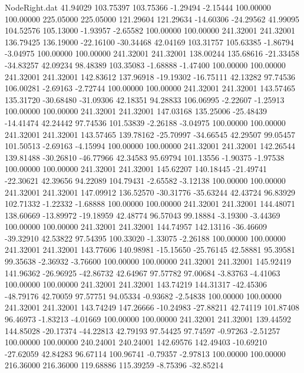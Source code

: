 \begin{filecontents}{NodeRight.dat}
  41.94029  103.75397  103.75366    -1.29494   -2.15444  100.00000  100.00000  225.05000  225.05000  121.29604  121.29634  -14.60306  -24.29562
  41.99095  104.52576  105.13000    -1.93957   -2.65582  100.00000  100.00000  241.32001  241.32001  136.79425  136.19000  -22.16100  -30.34468
  42.04169  103.31757  105.63385    -1.86794   -3.04975  100.00000  100.00000  241.32001  241.32001  138.00244  135.68616  -21.33458  -34.83257
  42.09234   98.48389  103.35083    -1.68888   -1.47400  100.00000  100.00000  241.32001  241.32001  142.83612  137.96918  -19.19302  -16.75111
  42.13282   97.74536  106.00281    -2.69163   -2.72744  100.00000  100.00000  241.32001  241.32001  143.57465  135.31720  -30.68480  -31.09306
  42.18351   94.28833  106.06995    -2.22607   -1.25913  100.00000  100.00000  241.32001  241.32001  147.03168  135.25006  -25.48439  -14.41474
  42.24442   97.74536  101.53839    -2.26188   -3.04975  100.00000  100.00000  241.32001  241.32001  143.57465  139.78162  -25.70997  -34.66545
  42.29507   99.05457  101.50513    -2.69163   -4.15994  100.00000  100.00000  241.32001  241.32001  142.26544  139.81488  -30.26810  -46.77966
  42.34583   95.69794  101.13556    -1.90375   -1.97538  100.00000  100.00000  241.32001  241.32001  145.62207  140.18445  -21.49741  -22.30621
  42.39656   94.22089  104.79431    -2.65582   -3.12138  100.00000  100.00000  241.32001  241.32001  147.09912  136.52570  -30.31776  -35.63244
  42.43724   96.83929  102.71332    -1.22332   -1.68888  100.00000  100.00000  241.32001  241.32001  144.48071  138.60669  -13.89972  -19.18959
  42.48774   96.57043   99.18884    -3.19300   -3.44369  100.00000  100.00000  241.32001  241.32001  144.74957  142.13116  -36.46609  -39.32910
  42.53822   97.54395  100.33020    -1.33075   -2.26188  100.00000  100.00000  241.32001  241.32001  143.77606  140.98981  -15.15650  -25.76145
  42.58881   95.39581   99.35638    -2.36932   -3.76600  100.00000  100.00000  241.32001  241.32001  145.92419  141.96362  -26.96925  -42.86732
  42.64967   97.57782   97.00684    -3.83763   -4.41063  100.00000  100.00000  241.32001  241.32001  143.74219  144.31317  -42.45306  -48.79176
  42.70059   97.57751   94.05334    -0.93682   -2.54838  100.00000  100.00000  241.32001  241.32001  143.74249  147.26666  -10.24983  -27.88211
  42.74119  101.87408   96.46973    -1.83213   -4.01669  100.00000  100.00000  241.32001  241.32001  139.44592  144.85028  -20.17374  -44.22813
  42.79193   97.54425   97.74597    -0.97263   -2.51257  100.00000  100.00000  240.24001  240.24001  142.69576  142.49403  -10.69210  -27.62059
  42.84283   96.67114  100.96741    -0.79357   -2.97813  100.00000  100.00000  216.36000  216.36000  119.68886  115.39259   -8.75396  -32.85214

\end{filecontents}
